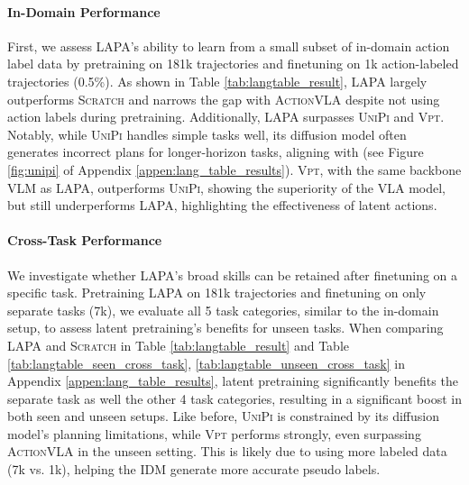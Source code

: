\documentclass{article} %
\begin{document}
\paragraph{In-Domain Performance} First, we assess LAPA's ability to learn from a small subset of in-domain action label data by pretraining on 181k trajectories and finetuning on 1k action-labeled trajectories (0.5\%). As shown in Table \ref{tab:langtable_result}, LAPA largely outperforms \textsc{Scratch} and narrows the gap with \textsc{ActionVLA} despite not using action labels during pretraining. Additionally, LAPA surpasses \textsc{UniPi} and \textsc{Vpt}. Notably, while \textsc{UniPi} handles simple tasks well, its diffusion model often generates incorrect plans for longer-horizon tasks, aligning with \citet{du2024video} (see Figure \ref{fig:unipi} of Appendix \ref{appen:lang_table_results}). \textsc{Vpt}, with the same backbone VLM as LAPA, outperforms \textsc{UniPi}, showing the superiority of the VLA model, but still underperforms LAPA, highlighting the effectiveness of latent actions.

\paragraph{Cross-Task Performance} We investigate whether LAPA's broad skills can be retained after finetuning on a specific task. Pretraining LAPA on 181k trajectories and finetuning on only separate tasks (7k), we evaluate all 5 task categories, similar to the in-domain setup, to assess latent pretraining's benefits for unseen tasks. When comparing LAPA and \textsc{Scratch} in Table \ref{tab:langtable_result} and Table \ref{tab:langtable_seen_cross_task}, \ref{tab:langtable_unseen_cross_task} in Appendix \ref{appen:lang_table_results}, latent pretraining significantly benefits the separate task as well the other 4 task categories, resulting in a significant boost in both seen and unseen setups. Like before, \textsc{UniPi} is constrained by its diffusion model's planning limitations, while \textsc{Vpt} performs strongly, even surpassing \textsc{ActionVLA} in the unseen setting. This is likely due to using more labeled data (7k vs. 1k), helping the IDM generate more accurate pseudo labels.
\end{document}
